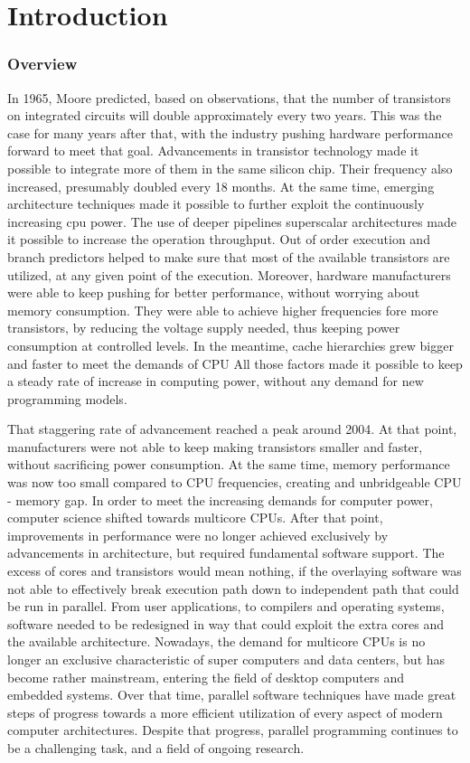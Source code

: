 \def\<#1>{\textit{#1}}


\chapter{Introduction}
\subsection{Overview}

In 1965, Moore predicted, based on observations, that the number of transistors on integrated circuits will double approximately every two years. This was the case for many years after that, with the industry pushing hardware performance forward to meet that goal. Advancements in transistor technology made it possible to integrate more of them in the same silicon chip. Their frequency also increased, presumably doubled every 18 months. At the same time, emerging architecture techniques made it possible to further exploit the continuously increasing cpu power. The use of deeper pipelines superscalar architectures made it possible to increase the operation throughput. Out of order execution and branch predictors helped to make sure that most of the available transistors are utilized, at any given point of the execution. Moreover, hardware manufacturers were able to keep pushing for better performance, without worrying about memory consumption. They were able to achieve higher frequencies fore more transistors, by reducing the voltage supply needed, thus keeping power consumption at controlled levels. In the meantime, cache hierarchies  grew bigger and faster to meet the demands of CPU All those factors made it possible to keep a steady rate of increase in computing power, without any demand for new programming models.

That staggering rate of advancement reached a peak around 2004. At that point, manufacturers were not able to keep making transistors smaller and faster, without sacrificing power consumption. At the same time, memory performance was now too small compared to CPU frequencies, creating and unbridgeable CPU -  memory gap. In order to meet the increasing demands for computer power, computer science shifted towards multicore CPUs. After that point, improvements in performance were no longer achieved exclusively by advancements in architecture, but required fundamental software support. The excess of cores and transistors would mean nothing, if the overlaying software was not able to effectively break execution path down to independent path that could be run in parallel. From user applications, to compilers and operating systems, software needed to be redesigned in way that could exploit the extra cores and the available architecture. Nowadays, the demand for multicore CPUs is no longer an exclusive characteristic of super computers and data centers, but has become rather mainstream, entering the field of desktop computers and embedded systems. Over that time, parallel software techniques have made great steps of progress towards a more efficient utilization of every aspect of modern computer architectures. Despite that progress, parallel programming continues to be a challenging task, and a field of ongoing research.

